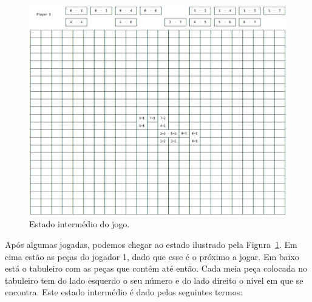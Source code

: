 \documentclass[a4paper]{article}
\begin{document}
\begin{figure}[htbp]
\begin{center}
\includegraphics[scale=0.44]{intermediate.jpg}
\caption{Estado intermédio do jogo.}
\label{intermediate}
\end{center}
\end{figure}

Após algumas jogadas, podemos chegar ao estado ilustrado pela Figura~\ref{intermediate}. Em cima estão as peças do jogador 1, dado que esse é o próximo a jogar. Em baixo está o tabuleiro com as peças que contém até então. Cada meia peça colocada no tabuleiro tem do lado esquerdo o seu número e do lado direito o nível em que se encontra. Este estado intermédio é dado pelos seguintes termos:
\end{document}
